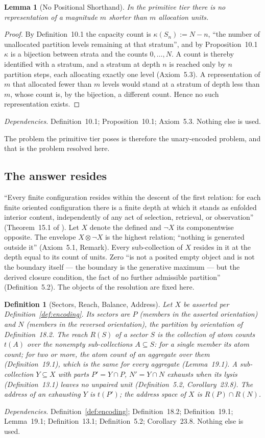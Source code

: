 \documentclass[pdflatex,sn-mathphys-num]{sn-jnl}
\theoremstyle{thmstyleone}%
\newtheorem{lemma}[theorem]{Lemma}
\theoremstyle{thmstyletwo}%
\theoremstyle{thmstylethree}%
\newtheorem{definition}{Definition}[section]
\newtheorem{lemma}[theorem]{Lemma}
\newtheorem{definition}{Definition}[section]
\newcommand{\PA}{\cite{Swanagon2026PA}}
\newcommand{\q}[1]{``#1''}        %
\newcommand{\deps}[1]{\par\begin{sloppypar}\noindent\emph{Dependencies.} #1 Nothing else is used.\end{sloppypar}}
\begin{document}
\begin{lemma}[No Positional Shorthand]\label{lem:shorthand}
In the primitive tier there is no representation of a magnitude $m$ shorter than $m$ allocation units.
\end{lemma}
\begin{proof}
By Definition~10.1 the capacity count is $\kappa(S_n):=N-n$, \q{the number of unallocated partition levels remaining at that stratum}, and by Proposition~10.1 $\kappa$ is a bijection between strata and the counts $0,\dots,N$. A count is thereby identified with a stratum, and a stratum at depth $n$ is reached only by $n$ partition steps, each allocating exactly one level (Axiom~5.3). A representation of $m$ that allocated fewer than $m$ levels would stand at a stratum of depth less than $m$, whose count is, by the bijection, a different count. Hence no such representation exists.
\end{proof}
\deps{Definition~10.1; Proposition~10.1; Axiom~5.3.}

\noindent The problem the primitive tier poses is therefore the unary-encoded problem, and that is the problem resolved here.

\subsection{The answer resides}
\q{Every finite configuration resides within the descent of the first relation: for each finite oriented configuration there is a finite depth at which it stands as enfolded interior content, independently of any act of selection, retrieval, or observation} (Theorem~15.1 of \PA). Let $X$ denote the defined and $\neg X$ its componentwise opposite. The envelope $X\otimes\neg X$ is the highest relation; \q{nothing is generated outside it} (Axiom~5.1, Remark). Every sub-collection of $X$ resides in it at the depth equal to its count of units. Zero \q{is not a posited empty object and is not the boundary itself --- the boundary is the generative maximum --- but the derived closure condition, the fact of no further admissible partition} (Definition~5.2). The objects of the resolution are fixed here.

\begin{definition}[Sectors, Reach, Balance, Address]\label{def:address}
Let $X$ be asserted per Definition~\ref{def:encoding}. Its \emph{sectors} are $P$ (members in the asserted orientation) and $N$ (members in the reversed orientation), the partition by orientation of Definition~18.2. The \emph{reach} $R(S)$ of a sector $S$ is the collection of atom counts $t(A)$ over the nonempty sub-collections $A\subseteq S$: for a single member its atom count; for two or more, the atom count of an aggregate over them (Definition~19.1), which is the same for every aggregate (Lemma~19.1). A sub-collection $Y\subseteq X$ with parts $P'=Y\cap P$, $N'=Y\cap N$ \emph{exhausts} when its lysis (Definition~13.1) leaves no unpaired unit (Definition~5.2, Corollary~23.8). The \emph{address} of an exhausting $Y$ is $t(P')$; the \emph{address space} of $X$ is $R(P)\cap R(N)$.
\end{definition}
\deps{Definition~\ref{def:encoding}; Definition~18.2; Definition~19.1; Lemma~19.1; Definition~13.1; Definition~5.2; Corollary~23.8.}
\end{document}
